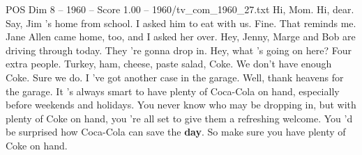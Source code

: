 \begin{textsample}{POS Dim 8 – 1960 – Score 1.00 – 1960/tv\_com\_1960\_27.txt}  \label{ex:f8_pos_066}
Hi, Mom.
Hi, dear.
Say, Jim 's home from school.
I asked him to eat with us.
Fine.
That reminds me.
Jane Allen came home, too, and I asked her over.
Hey, Jenny, Marge and Bob are driving through today.
They 're gonna drop in.
Hey, what 's going on here?
Four extra people.
Turkey, ham, cheese, paste salad, Coke.
We don't have enough Coke.
Sure we do.
I 've got another case in the garage.
Well, thank heavens for the garage.
It 's always smart to have plenty of Coca-Cola on hand, especially before weekends and holidays.
You never know who may be dropping in, but with plenty of Coke on hand, you 're all set to give them a refreshing welcome.
You 'd be surprised how Coca-Cola can save the \textbf{day}.
So make sure you have plenty of Coke on hand.

\end{textsample}
